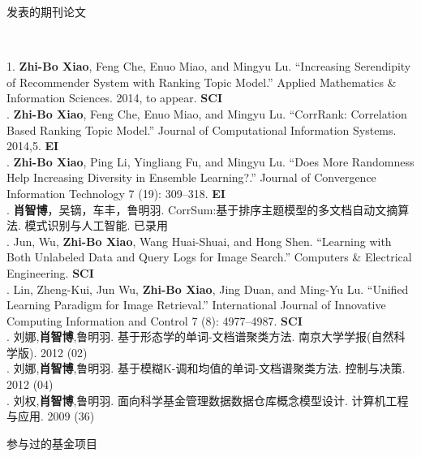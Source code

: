 \documentclass[9pt]{article}
\newenvironment{changemargin}[2]{%
  \begin{list}{}{%
    \setlength{\topsep}{0pt}%
    \setlength{\leftmargin}{#1}%
    \setlength{\rightmargin}{#2}%
    \setlength{\listparindent}{\parindent}%
    \setlength{\itemindent}{\parindent}%
    \setlength{\parsep}{\parskip}%
  }%
  \item[]}{\end{list}
}
\newcommand{\lineover}{
	\begin{changemargin}{-0.05in}{-0.05in}
		\vspace*{-8pt}
		\hrulefill \\
		\vspace*{-2pt}
	\end{changemargin}
}
\newcommand{\header}[1]{
	\begin{changemargin}{-0.5in}{-0.5in}
		\scshape{#1}\\
  	\lineover
	\end{changemargin}
}
\newenvironment{body} {
	\vspace*{-16pt}
	\begin{changemargin}{-0.25in}{-0.5in}
  }
	{\end{changemargin}
}
\begin{document}
\smallskip
\medskip
\header{\Large{发表的期刊论文}}
\begin{body}
	\vspace{14pt}
	1. \textbf{Zhi-Bo Xiao}, Feng Che, Enuo Miao, and Mingyu Lu. “Increasing Serendipity of Recommender System with Ranking Topic Model.” Applied Mathematics \& Information Sciences. 2014, to appear. \textbf{SCI}\\
	. \textbf{Zhi-Bo Xiao}, Feng Che, Enuo Miao, and Mingyu Lu. “CorrRank: Correlation Based Ranking Topic Model.” Journal of Computational Information Systems. 2014,5. \textbf{EI}\\
	. \textbf{Zhi-Bo Xiao}, Ping Li, Yingliang Fu, and Mingyu Lu. “Does More Randomness Help Increasing Diversity in Ensemble Learning?.” Journal of Convergence Information Technology 7 (19): 309–318. \textbf{EI}\\
	. \textbf{肖智博}，吴镝，车丰，鲁明羽. CorrSum:基于排序主题模型的多文档自动文摘算法. 模式识别与人工智能. 已录用\\
	. Jun, Wu, \textbf{Zhi-Bo Xiao}, Wang Huai-Shuai, and Hong Shen. “Learning with Both Unlabeled Data and Query Logs for Image Search.” Computers \& Electrical Engineering. \textbf{SCI}\\
	. Lin, Zheng-Kui, Jun Wu, \textbf{Zhi-Bo Xiao}, Jing Duan, and Ming-Yu Lu. “Unified Learning Paradigm for Image Retrieval.” International Journal of Innovative Computing Information and Control 7 (8): 4977–4987. \textbf{SCI}\\
	. 刘娜,\textbf{肖智博},鲁明羽. 基于形态学的单词-文档谱聚类方法. 南京大学学报(自然科学版). 2012 (02)\\
	. 刘娜,\textbf{肖智博},鲁明羽. 基于模糊K-调和均值的单词-文档谱聚类方法. 控制与决策. 2012 (04)\\
	. 刘权,\textbf{肖智博},鲁明羽.   面向科学基金管理数据数据仓库概念模型设计. 计算机工程与应用. 2009 (36)

\end{body}

\smallskip
\medskip
\header{\Large{参与过的基金项目}}
\end{document}
